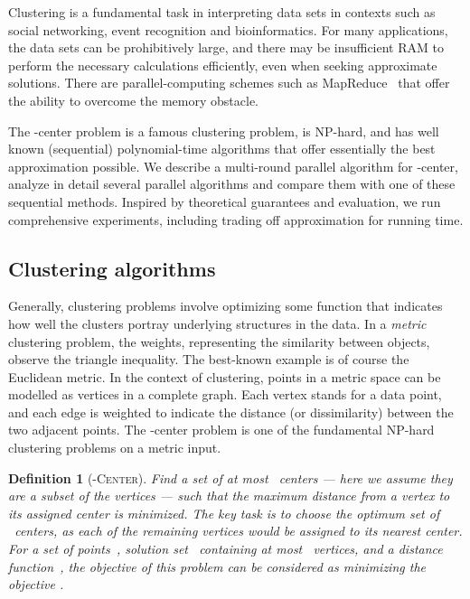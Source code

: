 \documentclass[11pt]{article}
\newtheorem*{definition}{Definition}
\begin{document}
Clustering is a fundamental task in interpreting data sets in contexts such as social networking, event recognition and bioinformatics.
For many applications, the data sets can be prohibitively large, and there may be
insufficient RAM to perform the necessary calculations efficiently,
even when seeking approximate solutions. 
There are parallel-computing schemes such as MapReduce~\cite{dean2008mapreduce}
that offer the ability to overcome the memory obstacle.


The -center problem is a famous clustering problem, is NP-hard, and has
well known (sequential) polynomial-time algorithms that offer essentially the best
approximation possible.
We describe a multi-round parallel algorithm for -center, analyze in detail several
parallel algorithms and compare them with
one of these sequential methods.
Inspired by theoretical guarantees and evaluation, we run comprehensive
experiments, including trading off approximation for running time.

\subsection{Clustering algorithms}

Generally, clustering problems involve optimizing some function that indicates how well the clusters
portray underlying structures in the data.
In a \emph{metric} clustering problem, the
weights, representing the similarity between objects,
observe the triangle inequality.
The best-known example is of course the Euclidean metric.
In the context of clustering, points in a metric space can be modelled as vertices in a complete graph.
Each vertex stands for a data point, and each edge is weighted to
indicate the distance (or dissimilarity) between the two adjacent points.
The -center problem is one of the fundamental NP-hard clustering problems on a metric input.



\begin{definition}[-\textsc{Center}]
Find a set of at most~ centers ---
here we assume they are a subset of the vertices ---
such that the maximum distance from a vertex to its assigned center
is minimized.
The key task is to choose the optimum set of ~centers, as each of the
remaining vertices would be assigned to its nearest center.
For a set of points~, solution set~ containing at most~ vertices,
and a distance function~, the objective of this problem can be considered as minimizing the objective .
\end{definition}	
\end{document}
